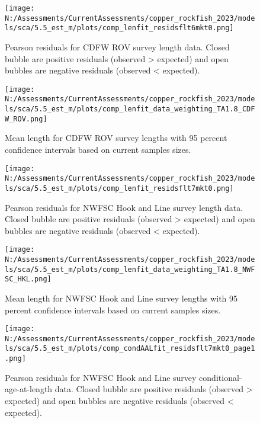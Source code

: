 \documentclass[11pt,
  english,
  letterpaper,
]{article}
\begin{document}
\begin{figure}
\centering
\texttt{[image: N:/Assessments/CurrentAssessments/copper\_rockfish\_2023/models/sca/5.5\_est\_m/plots/comp\_lenfit\_residsflt6mkt0.png]}
\caption{Pearson residuals for CDFW ROV survey length data. Closed bubble are positive residuals (observed \textgreater{} expected) and open bubbles are negative residuals (observed \textless{} expected).\label{fig:rov-pearson}}
\end{figure}

\begin{figure}
\centering
\texttt{[image: N:/Assessments/CurrentAssessments/copper\_rockfish\_2023/models/sca/5.5\_est\_m/plots/comp\_lenfit\_data\_weighting\_TA1.8\_CDFW\_ROV.png]}
\caption{Mean length for CDFW ROV survey lengths with 95 percent confidence intervals based on current samples sizes.\label{fig:rov-mean-len-fit}}
\end{figure}

\begin{figure}
\centering
\texttt{[image: N:/Assessments/CurrentAssessments/copper\_rockfish\_2023/models/sca/5.5\_est\_m/plots/comp\_lenfit\_residsflt7mkt0.png]}
\caption{Pearson residuals for NWFSC Hook and Line survey length data. Closed bubble are positive residuals (observed \textgreater{} expected) and open bubbles are negative residuals (observed \textless{} expected).\label{fig:nwfsc-hkl-pearson}}
\end{figure}

\begin{figure}
\centering
\texttt{[image: N:/Assessments/CurrentAssessments/copper\_rockfish\_2023/models/sca/5.5\_est\_m/plots/comp\_lenfit\_data\_weighting\_TA1.8\_NWFSC\_HKL.png]}
\caption{Mean length for NWFSC Hook and Line survey lengths with 95 percent confidence intervals based on current samples sizes.\label{fig:nwfsc-hkl-mean-len-fit}}
\end{figure}

\begin{figure}
\centering
\texttt{[image: N:/Assessments/CurrentAssessments/copper\_rockfish\_2023/models/sca/5.5\_est\_m/plots/comp\_condAALfit\_residsflt7mkt0\_page1.png]}
\caption{Pearson residuals for NWFSC Hook and Line survey conditional-age-at-length data. Closed bubble are positive residuals (observed \textgreater{} expected) and open bubbles are negative residuals (observed \textless{} expected).\label{fig:nwfsc-hkl-age-pearson-1}}
\end{figure}
\end{document}
